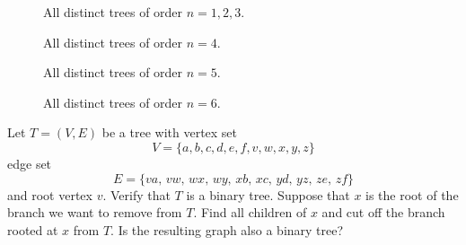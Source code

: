 \begin{figure}[!htbp]
\centering
{}

\caption{All distinct trees of order $n = 1, 2, 3$.}
\label{fig:trees_forests:distinct_trees_specified_order_1_2_3}
\end{figure}

\begin{figure}[!htbp]
\centering
{}

\caption{All distinct trees of order $n = 4$.}
\label{fig:trees_forests:distinct_trees_specified_order_4}
\end{figure}

\begin{figure}[!htbp]
\centering
{}

\caption{All distinct trees of order $n = 5$.}
\label{fig:trees_forests:distinct_trees_specified_order_5}
\end{figure}

\begin{figure}[!htbp]
\centering
{}

\caption{All distinct trees of order $n = 6$.}
\label{fig:trees_forests:distinct_trees_specified_order_6}
\end{figure}

\begin{example}
\label{eg:trees_forests:branch_cut_binary_tree}
Let $T = (V, E)$ be a tree with vertex set
\[
V
=
\{a, b, c, d, e, f, v, w, x, y, z\}
\]
edge set
\[
E
=
\{va,\, vw,\, wx,\, wy,\, xb,\, xc,\, yd,\, yz,\, ze,\, zf\}
\]
and root vertex $v$. Verify that $T$ is a binary
tree. Suppose that $x$ is the root of the branch we
want to remove from $T$. Find all children of $x$ and
cut off the branch rooted at $x$ from $T$. Is the
resulting graph also a binary tree?
\end{example}

